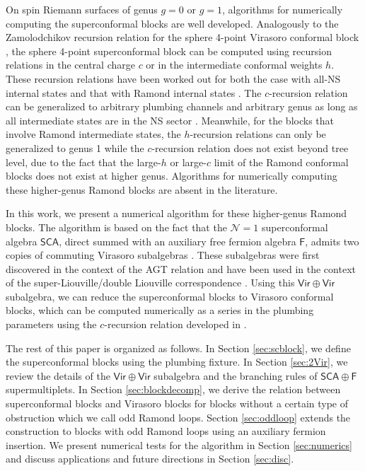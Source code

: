 \documentclass[12pt]{article}
\begin{document}
On spin Riemann surfaces of genus $g=0$ or $g=1$, algorithms for numerically computing the superconformal blocks are well developed. Analogously to the Zamolodchikov recursion relation for the sphere 4-point Virasoro conformal block \cite{Zamolodchikov:1984eqp,Zamolodchikov:1987avt}, the sphere 4-point superconformal block can be computed using recursion relations in the central charge $c$ or in the intermediate conformal weights $h$. These recursion relations have been worked out for both the case with all-NS internal states \cite{Hadasz:2006qb,Hadasz:2007nt,Belavin:2007zz} and that with Ramond internal states \cite{Hadasz:2008dt,Suchanek:2010kq}. The $c$-recursion relation can be generalized to arbitrary plumbing channels and arbitrary genus as long as all intermediate states are in the NS sector \cite{Belavin:2018hfm}. Meanwhile, for the blocks that involve Ramond intermediate states, the $h$-recursion relations can only be generalized to genus 1 \cite{Hadasz:2012im, Collier:2026bhh} while the $c$-recursion relation does not exist beyond tree level, due to the fact that the large-$h$ or large-$c$ limit of the Ramond conformal blocks does not exist at higher genus. Algorithms for numerically computing these higher-genus Ramond blocks are absent in the literature.

In this work, we present a numerical algorithm for these higher-genus Ramond blocks. The algorithm is based on the fact that the $\mathcal{N}=1$ superconformal algebra $\mathsf{SCA}$, direct summed with an auxiliary free fermion algebra $\mathsf{F}$, admits two copies of commuting Virasoro subalgebras \cite{Belavin:2011sw, Schomerus:2012se, Bershtein:2014yia,Bershtein:2016uov}. These subalgebras were first discovered in the context of the AGT relation \cite{Alday:2009aq} and have been used in the context of the super-Liouville/double Liouville correspondence \cite{Hadasz:2013dza}. Using this $\mathsf{Vir}\oplus \mathsf{Vir}$ subalgebra, we can reduce the superconformal blocks to  Virasoro conformal blocks, which can be computed numerically as a series in the plumbing parameters using the $c$-recursion relation developed in \cite{Cho:2017oxl}.

The rest of this paper is organized as follows. In Section \ref{sec:scblock}, we define the superconformal blocks using the plumbing fixture. In Section \ref{sec:2Vir}, we review the details of the $\mathsf{Vir}\oplus \mathsf{Vir}$ subalgebra and the branching rules of $\mathsf{SCA}\oplus \mathsf{F}$ supermultiplets. In Section \ref{sec:blockdecomp}, we derive the relation between superconformal blocks and Virasoro blocks for blocks without a certain type of obstruction which we call odd Ramond loops. Section \ref{sec:oddloop} extends the construction to blocks with odd Ramond loops using an auxiliary fermion insertion. We present numerical tests for the algorithm in Section \ref{sec:numerics} and discuss applications and future directions in Section \ref{sec:disc}.
\end{document}
